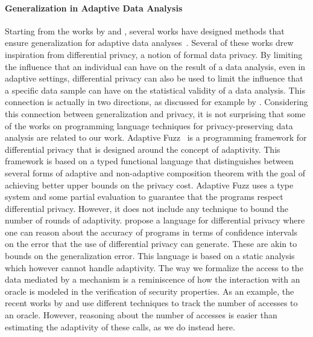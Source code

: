\paragraph{Generalization in Adaptive Data Analysis}
Starting from the works by \citet{DworkFHPRR15} and \citet{HardtU14}, several works have designed methods that ensure generalization for adaptive data analyses~\cite{dwork2015reusable,dwork2015generalization,BassilyNSSSU16,UllmanSNSS18,FeldmanS17,jung2019new,SteinkeZ20,RogersRSSTW20}.
Several of these works drew inspiration from differential privacy, a notion of formal data privacy. By limiting the influence that an individual can have on the result of a data analysis, even in adaptive settings, differential privacy can also be used to limit the influence that a specific data sample can have on the statistical validity of a data analysis. This connection is actually in two directions, as discussed for example by \citet{YeomGFJ18}.
%
Considering this connection between generalization and privacy, it is not surprising that some of the works on programming language techniques for privacy-preserving data analysis are related to our work. 
Adaptive Fuzz~\cite{Winograd-CortHR17} is a programming framework for differential privacy that is designed around the concept of adaptivity. 
This framework is based on a typed functional language that distinguishes between several forms of adaptive and non-adaptive composition theorem with the goal of achieving better upper bounds on the privacy cost. Adaptive Fuzz uses a type system and some partial evaluation to guarantee that the programs respect differential privacy. However, it does not include any technique to bound the number of rounds of adaptivity. 
\citet{lobo2021programming} propose a language for differential privacy where one can reason about the accuracy of programs in terms of confidence intervals on the error that the use of differential privacy can generate. These are akin to bounds on the generalization error. This language is based on a static analysis which however cannot handle adaptivity. 
%
The way we formalize the access to the data mediated by a mechanism is a reminiscence of how the interaction with an oracle is modeled in the verification of security properties. As an example, the recent works by \citet{BarbosaBGKS21} and \citet{AguirreBGGKS21} use different techniques to track the number of accesses to an oracle. However, reasoning about the number of accesses is easier than estimating the adaptivity of these calls, as we do instead here.

